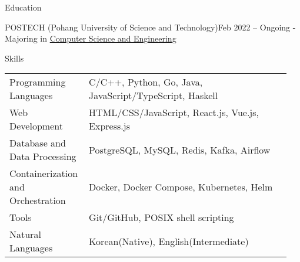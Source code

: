\documentclass{resume}
\begin{document}
\begin{rSection}{Education}
    \begin{rSubsection}{POSTECH (Pohang University of Science and Technology)}{Feb 2022 -- Ongoing}
        - Majoring in \href{https://cse.postech.ac.kr}{Computer Science and Engineering} \\
    \end{rSubsection}
\end{rSection}

\begin{rSection}{Skills}
    \begin{tabular}{@{}p{0.25\linewidth}p{0.7\linewidth}}
        Programming Languages
            & C/C++, Python, Go, Java, JavaScript/TypeScript, Haskell \\ [0.5em]

        Web Development
            & HTML/CSS/JavaScript, React.js, Vue.js, Express.js \\ [0.5em]

        \raggedright Database and Data Processing
            & PostgreSQL, MySQL, Redis, Kafka, Airflow \\ [1.7em]

        \raggedright Containerization and Orchestration
            & Docker, Docker Compose, Kubernetes, Helm \\ [1.7em]

        Tools
            & Git/GitHub, POSIX shell scripting \\ [0.5em]

        Natural Languages
            & Korean(Native), English(Intermediate) \\ [0.5em]
    \end{tabular}
\end{rSection}
\end{document}
